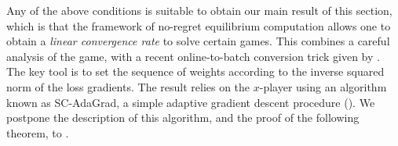 \documentclass[pmlr]{jmlr} %
\def\reals{\mathbb{R}}
\def\reals{\mathbb{R}}
\newcommand{\yx}[1]{y_{#1}}
\newcommand{\XX}{\mathcal{X}}
\newcommand{\YY}{\mathcal{Y}}
\begin{document}
Any of the above conditions is suitable to obtain our main result of this section, which is that the framework of no-regret equilibrium computation allows one to obtain a \emph{linear convergence rate} to solve certain games. This combines a careful analysis of the game, with a recent online-to-batch conversion trick given by \citet{L17}. The key tool is to set the sequence of weights according to the inverse squared norm of the loss gradients. The result relies on the $x$-player using an algorithm known as SC-AdaGrad, a simple adaptive gradient descent procedure (). We postpone the description of this algorithm, and the proof of the following theorem, to .









\end{document}
